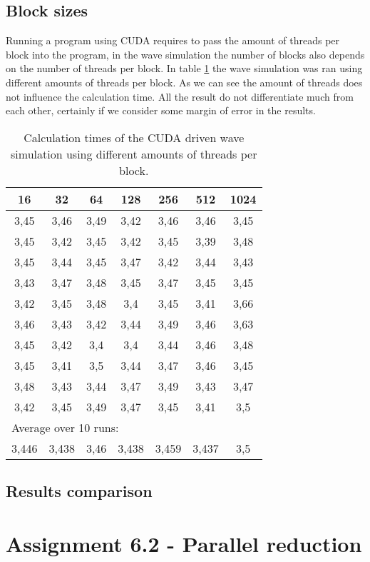 \documentclass[a4paper]{article}
\begin{document}
	
	
	\subsection{Block sizes}
		Running a program using CUDA requires to pass the amount of threads per block into the program, in the wave simulation the number of blocks also depends on the number of threads per block.
		In table \ref{table:blockSizes} the wave simulation was ran using different amounts of threads per block.
		As we can see the amount of threads does not influence the calculation time.
		All the result do not differentiate much from each other, certainly if we consider some margin of error in the results.
	
		\begin{table}[H]
			\caption{Calculation times of the CUDA driven wave simulation using different amounts of threads per block.}
			\label{table:blockSizes}
			\begin{center}
				\begin{tabular}{| c | c | c | c | c | c | c |}
					\hline
					16 & 32 & 64 & 128 & 256 & 512 & 1024\\ 
					\hline
					3,45 & 3,46 & 3,49 & 3,42 & 3,46 & 3,46 & 3,45\\ 
					\hline
					3,45 & 3,42 & 3,45 & 3,42 & 3,45 & 3,39 & 3,48\\ 
					\hline
					3,45 & 3,44 & 3,45 & 3,47 & 3,42 & 3,44 & 3,43\\ 
					\hline
					3,43 & 3,47 & 3,48 & 3,45 & 3,47 & 3,45 & 3,45\\ 
					\hline
					3,42 & 3,45 & 3,48 & 3,4 & 3,45 & 3,41 & 3,66\\ 
					\hline
					3,46 & 3,43 & 3,42 & 3,44 & 3,49 & 3,46 & 3,63\\ 
					\hline
					3,45 & 3,42 & 3,4 & 3,4 & 3,44 & 3,46 & 3,48\\ 
					\hline
					3,45 & 3,41 & 3,5 & 3,44 & 3,47 & 3,46 & 3,45\\ 
					\hline
					3,48 & 3,43 & 3,44 & 3,47 & 3,49 & 3,43 & 3,47\\ 
					\hline
					3,42 & 3,45 & 3,49 & 3,47 & 3,45 & 3,41 & 3,5\\ 
					\hline
					\multicolumn{7}{|l|}{Average over 10 runs:}\\
					\hline
					3,446 & 3,438 & 3,46 & 3,438 & 3,459 & 3,437 & 3,5\\ 
					\hline
				\end{tabular}
			\end{center}
		\end{table}
		
	
	\subsection{Results comparison}
	
	

\section{Assignment 6.2 - Parallel reduction}
\end{document}
